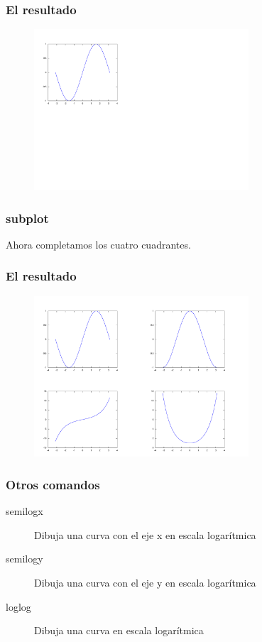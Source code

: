 \documentclass[12pt]{beamer}
\begin{document}
\begin{large}
\begin{frame}
\frametitle{El resultado}
  \begin{figure}[h]
    \centering{}
    \includegraphics[width=8cm, keepaspectratio]{fig/subplot1.pdf}
  \end{figure}
\end{frame}



\begin{frame}
\frametitle{subplot}
Ahora completamos los cuatro cuadrantes.
\testcode
\end{frame}

\begin{frame}
\frametitle{El resultado}
  \begin{figure}[h]
    \centering{}
    \includegraphics[width=8cm, keepaspectratio]{fig/subplot2.pdf}
  \end{figure}
\end{frame}

\begin{frame}
\frametitle{Otros comandos}
\begin{description}
\item[semilogx] Dibuja una curva con el eje x en escala logarítmica
\item[semilogy] Dibuja una curva con el eje y en escala logarítmica
\item[loglog] Dibuja una curva en escala logarítmica
\end{description}
\end{frame}


\end{large}
\end{document}
